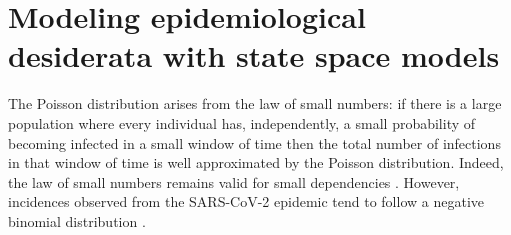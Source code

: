 
\section{Modeling epidemiological desiderata with state space models}
\label{sec:modelling_epidemiological_dessiderata_with_state_space_models}
The Poisson distribution arises from the law of small numbers: if there is a large population where every individual has, independently, a small probability of becoming infected in a small window of time then the total number of infections in that window of time is well approximated by the Poisson distribution.
Indeed, the law of small numbers remains valid for small dependencies \citep{Ross2011Fundamentalsa,Arratia1990Poisson}.
However, incidences observed from the SARS-CoV-2 epidemic tend to follow a negative binomial distribution \citep{Chan2021Count}. 
